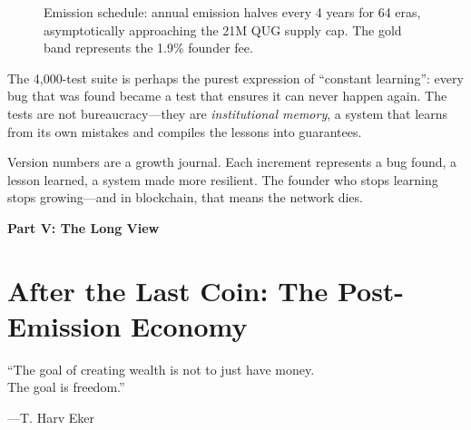 \documentclass[11pt,a4paper]{article}
\begin{document}
\begin{figure}[H]
\caption{Emission schedule: annual emission halves every 4 years for 64 eras,
asymptotically approaching the 21M QUG supply cap. The gold band represents
the 1.9\% founder fee.}
\label{fig:emission-curve}
\end{figure}

The 4{,}000-test suite is perhaps the purest expression of ``constant
learning'': every bug that was found became a test that ensures it can
never happen again. The tests are not bureaucracy---they are
\emph{institutional memory}, a system that learns from its own mistakes
and compiles the lessons into guarantees.

\begin{principle}[title={\textbf{The Principle}}]
Version numbers are a growth journal. Each increment represents a bug
found, a lesson learned, a system made more resilient. The founder who
stops learning stops growing---and in blockchain, that means the
network dies.
\end{principle}


\newpage
\begin{center}
{\LARGE\bfseries\color{ekerred!80!black} Part V: The Long View}\\[0.3cm]
\end{center}
\vspace{0.5cm}

\section{After the Last Coin: The Post-Emission Economy}

\epigraph{``The goal of creating wealth is not to just have money.\\
The goal is freedom.''}%
{---T. Harv Eker}
\end{document}
